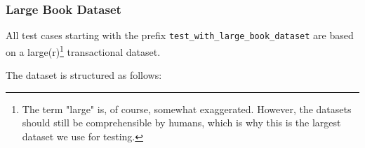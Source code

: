 \documentclass[
english,
smallborders
]{i6prcsht}
\begin{document}
\vspace*{1cm}

\subsubsection*{Large Book Dataset}

All test cases starting with the prefix \texttt{test\_with\_large\_book\_dataset} are based on a large(r)\footnote{The term "large" is, of course, somewhat exaggerated. However, the datasets should still be comprehensible by humans, which is why this is the largest dataset we use for testing.} transactional dataset.

The dataset is structured as follows:

\vspace*{0.7cm}
\end{document}
